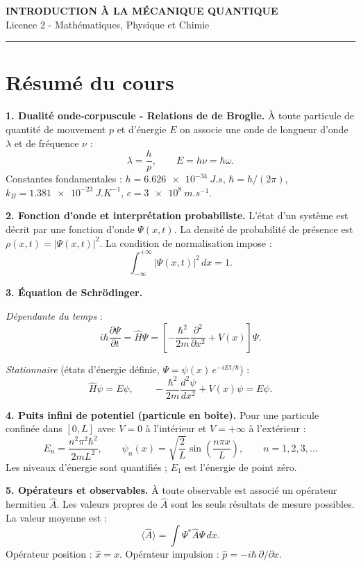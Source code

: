 \documentclass[12pt,a4paper]{article}
\begin{document}
\fi

\begin{center}
  {\LARGE\bfseries INTRODUCTION À LA MÉCANIQUE QUANTIQUE}\\[0.3cm]
  {\normalsize Licence 2 - Mathématiques, Physique et Chimie}\\[0.1cm]
  \rule{0.7\textwidth}{0.8pt}
\end{center}

\section*{Résumé du cours}

\begin{boiteresume}

\textbf{1. Dualité onde-corpuscule - Relations de de Broglie.}
À toute particule de quantité de mouvement $p$ et d'énergie $E$ on associe une onde de longueur
d'onde $\lambda$ et de fréquence $\nu$ :
\[
  \lambda = \frac{h}{p}, \qquad E = h\nu = \hbar\omega.
\]
Constantes fondamentales : $h = \qty{6.626e-34}{J.s}$, $\hbar = h/(2\pi)$,
$k_B = \qty{1.381e-23}{J.K^{-1}}$, $c = \qty{3e8}{m.s^{-1}}$.

\textbf{2. Fonction d'onde et interprétation probabiliste.}
L'état d'un système est décrit par une fonction d'onde $\Psi(x,t)$. La densité de probabilité de
présence est $\rho(x,t) = |\Psi(x,t)|^2$. La condition de normalisation impose :
\[
  \int_{-\infty}^{+\infty} |\Psi(x,t)|^2 \, dx = 1.
\]

\textbf{3. Équation de Schrödinger.}

\textit{Dépendante du temps} :
\[
  i\hbar\frac{\partial\Psi}{\partial t} = \hat{H}\Psi =
  \left[-\frac{\hbar^2}{2m}\frac{\partial^2}{\partial x^2} + V(x)\right]\Psi.
\]

\textit{Stationnaire} (états d'énergie définie, $\Psi = \psi(x)\,e^{-iEt/\hbar}$) :
\[
  \hat{H}\psi = E\psi, \qquad
  -\frac{\hbar^2}{2m}\frac{d^2\psi}{dx^2} + V(x)\psi = E\psi.
\]

\textbf{4. Puits infini de potentiel (particule en boîte).}
Pour une particule confinée dans $[0,L]$ avec $V=0$ à l'intérieur et $V=+\infty$ à l'extérieur :
\[
  E_n = \frac{n^2\pi^2\hbar^2}{2mL^2}, \qquad
  \psi_n(x) = \sqrt{\frac{2}{L}}\sin\!\left(\frac{n\pi x}{L}\right), \qquad n = 1, 2, 3, \ldots
\]
Les niveaux d'énergie sont quantifiés ; $E_1$ est l'énergie de point zéro.

\textbf{5. Opérateurs et observables.}
À toute observable est associé un opérateur hermitien $\hat{A}$. Les valeurs propres de $\hat{A}$
sont les seuls résultats de mesure possibles. La valeur moyenne est :
\[
  \langle\hat{A}\rangle = \int\Psi^*\hat{A}\Psi\,dx.
\]
Opérateur position : $\hat{x} = x$. Opérateur impulsion : $\hat{p} = -i\hbar\,\partial/\partial x$.


\end{boiteresume}
\end{document}
